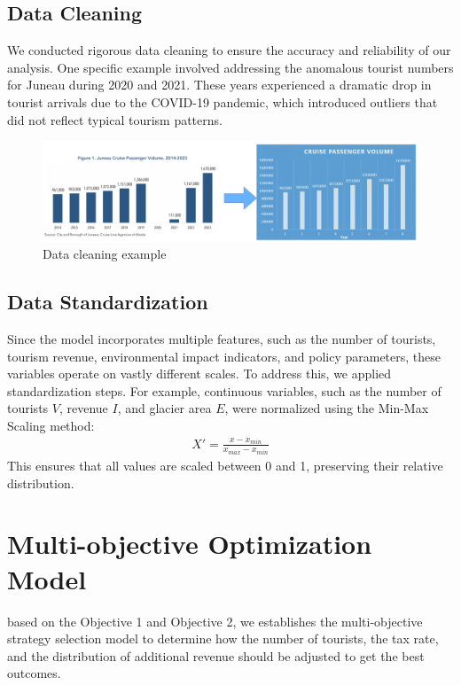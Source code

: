 \documentclass[UTF8]{mcmthesis}
\begin{document}
        \subsection{Data Cleaning}
        \hspace*{2em}We conducted rigorous data cleaning to ensure the accuracy and reliability of our analysis. One specific example involved addressing the anomalous tourist numbers for Juneau during 2020 and 2021. These years experienced a dramatic drop in tourist arrivals due to the COVID-19 pandemic, which introduced outliers that did not reflect typical tourism patterns.
        \begin{figure}[htbp]
            \centering
            \includegraphics[width=16cm]{dataclean.png}
            \caption{Data cleaning example}
        \end{figure}

        \subsection{Data Standardization}
        \hspace*{2em}Since the model incorporates multiple features, such as the number of tourists, tourism revenue, environmental impact indicators, and policy parameters, these variables operate on vastly different scales. To address this, we applied standardization steps. For example, continuous variables, such as the number of tourists {$V$}, revenue {$I$}, and glacier area {$E$}, were normalized using the Min-Max Scaling method:
        \begin{equation}
        \begin{aligned}
            {X}' = \frac{x-x_{min}}{x_{max}-x_{min}} 
        \end{aligned}
        \end{equation}
        \hspace*{2em} This ensures that all values are scaled between 0 and 1, preserving their relative distribution.


    \section{Multi-objective Optimization Model}
    \hspace*{2em}based on the Objective 1 and Objective 2, we establishes the multi-objective strategy selection model to determine how the number of tourists, the tax rate, and the distribution of additional revenue should be adjusted to get the best outcomes.
\end{document}
